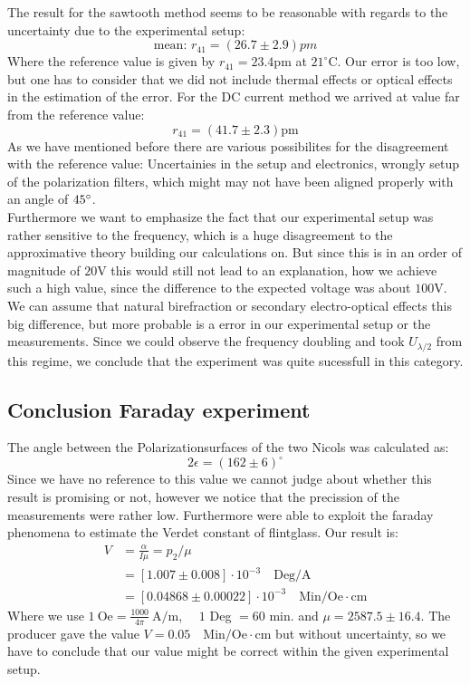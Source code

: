 The result for the sawtooth method seems to be reasonable with regards to the uncertainty
due to the experimental setup:
\begin{equation}
    \text{mean: } r_{41}= (26.7 \pm 2.9) pm
\end{equation}
Where the reference value is given by $r_{41} = 23.4$pm at $21^{\circ}$C. Our error is too low,
but one has to consider that we did not include thermal effects or optical effects in the 
estimation of the error.
For the DC current method we arrived at value far from the reference value:
\begin{equation}
    r_{41} = (41.7 \pm 2.3) \textrm{pm} 
\end{equation}
As we have mentioned before there are various possibilites for the disagreement with
the reference value: Uncertainies in the setup and electronics,
wrongly setup of the polarization filters, 
which might may not have been aligned properly with an 
angle of $45^\circ$.  \\
Furthermore we want to emphasize the fact that our experimental setup
was rather sensitive to the frequency, which is a huge disagreement to the
approximative theory building our calculations on. But since this is in
an order of magnitude of $20$V this would still not lead to an explanation,
how we achieve such a high value, since the difference to the expected 
voltage was about $100$V. We can assume that natural birefraction or 
secondary electro-optical effects this big difference, but more probable is 
a error in our experimental setup or the measurements. Since we could observe
the frequency doubling and took $U_{\lambda/2}$ from this regime, we 
conclude that the experiment was quite sucessfull in this category.



\subsection{Conclusion Faraday experiment}
The angle between the Polarizationsurfaces of the two Nicols was calculated as:\\
\begin{equation*}
2\epsilon = (162\pm 6) ^{\circ} 
\end{equation*}
Since we have no reference to this value we cannot judge about whether this result is promising
or not, however we notice that the precission of the measurements were rather low.
Furthermore were able to exploit the
faraday phenomena to estimate the Verdet constant of flintglass.
Our result is:
\begin{align*}
    V &= \frac{\alpha}{I\mu}   = p_2 / \mu \\
      &= \left [ 1.007 \pm 0.008 \right ]\cdot 10^{-3} \quad \mathrm{Deg/A} \\
      &= \left [ 0.04868 \pm 0.00022 \right ] \cdot 10^{-3} \quad \mathrm{Min/Oe\cdot cm}
\end{align*}
Where we use $1\ \mathrm{Oe} = \frac{1000}{4\pi}\ \mathrm{A/m}$, $\quad1$ Deg $=60$ min. and $\mu = 2587.5\pm16.4$.
The producer gave the value $V = 0.05 \quad \mathrm{Min/Oe \cdot cm}$ but without uncertainty, so
we have to conclude that our value might be correct within the given experimental setup. 
